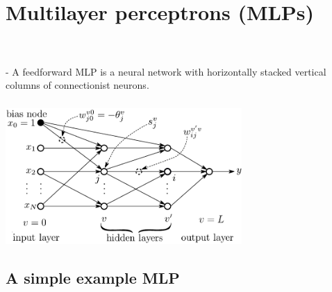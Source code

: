 \section{Multilayer perceptrons (MLPs)}

\begin{frame}\frametitle{\secname}

 \\

\pause

- A feedforward MLP is a neural network with horizontally stacked vertical columns of connectionist neurons.
\end{frame}

\begin{frame} \frametitle{\secname} 
	\begin{center} 
		\includegraphics[width=9cm]{img/section1_fig14.pdf} 
	\end{center}
\end{frame}

\subsection{A simple example MLP}

